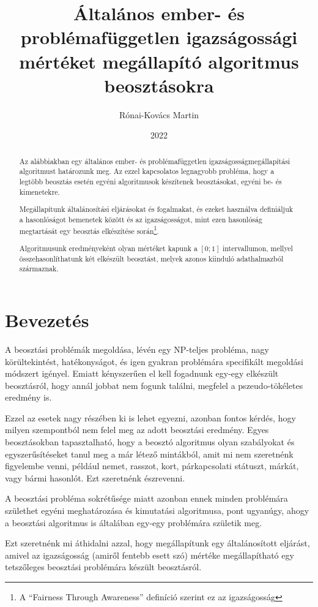 \documentclass[twocolumn]{article}
\title{Általános ember- és problémafüggetlen igazságossági mértéket megállapító algoritmus beosztásokra}
\author{Rónai-Kovács Martin}
\date{2022}
\theoremstyle{definition}
\begin{document}
\maketitle

\begin{abstract}
    Az alábbiakban egy általános ember- és problémafüggetlen igazságosságmegállapítási algoritmust határozunk meg. Az ezzel kapcsolatos legnagyobb probléma, hogy a legtöbb beosztás esetén egyéni algoritmusok készítenek beosztásokat, egyéni be- és kimenetekre. 
    
    Megállapítunk általánosítási eljárásokat és fogalmakat, és ezeket használva definiáljuk a hasonlóságot bemenetek között és az igazságosságot, mint ezen hasonlóság megtartását egy beosztás elkészítése során\footnote{A \enquote{Fairness Through Awareness} definíció szerint ez az igazságosság}. 
    
    Algoritmusunk eredményeként olyan mértéket kapunk a $[0; 1]$ intervallumon, mellyel összehasonlíthatunk két elkészült beosztást, melyek azonos kiinduló adathalmazból származnak.
\end{abstract}

\section{Bevezetés}
    A beosztási problémák megoldása, lévén egy NP-teljes probléma, nagy körültekintést, hatékonyságot, és igen gyakran problémára specifikált megoldási módszert igényel. Emiatt kényszerűen el kell fogadnunk egy-egy elkészült beosztásról, hogy annál jobbat nem fogunk találni, megfelel a pszeudo-tökéletes eredmény is. 
    
    Ezzel az esetek nagy részében ki is lehet egyezni, azonban fontos kérdés, hogy milyen szempontból nem felel meg az adott beosztási eredmény. Egyes beosztásokban tapasztalható, hogy a beosztó algoritmus olyan szabályokat és egyszerűsítéseket tanul meg a már létező mintákból, amit mi nem szeretnénk figyelembe venni, például nemet, rasszot, kort, párkapcsolati státuszt, márkát, vagy bármi hasonlót. Ezt szeretnénk észrevenni.
    
    A beosztási probléma sokrétűsége miatt azonban ennek minden problémára születhet egyéni meghatározása és kimutatási algoritmusa, pont ugyanúgy, ahogy a beosztási algoritmus is általában egy-egy problémára születik meg.
    
    Ezt szeretnénk mi áthidalni azzal, hogy megállapítunk egy általánosított eljárást, amivel az igazságosság (amiről fentebb esett szó) mértéke megállapítható egy tetszőleges beosztási problémára készült beosztásról.
    
\end{document}
